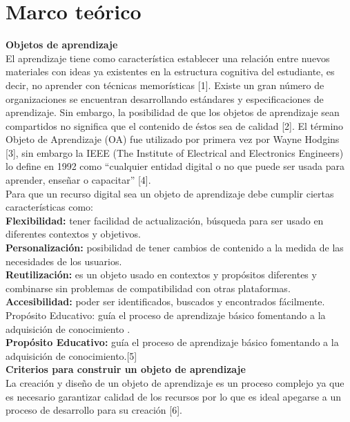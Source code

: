 \documentclass{llncs}
\begin{document}
\section{Marco teórico}
\textbf{Objetos de aprendizaje} \\
El aprendizaje tiene como característica establecer una relación entre nuevos materiales con ideas ya existentes en la estructura cognitiva del estudiante, es decir,  no aprender con técnicas memorísticas [1]. Existe un gran número de organizaciones se encuentran desarrollando estándares y especificaciones de aprendizaje. Sin embargo, la posibilidad de que los objetos de aprendizaje sean compartidos no significa que el contenido de éstos sea de calidad [2].
El término Objeto de Aprendizaje (OA) fue utilizado por primera vez por Wayne Hodgins [3], sin embargo la IEEE (The Institute of Electrical and Electronics Engineers) lo define en 1992 como “cualquier entidad digital o no que puede ser usada para aprender, enseñar o capacitar” [4].\\
Para que un recurso digital  sea un objeto de aprendizaje debe cumplir ciertas características como:\\
\textbf{Flexibilidad:} tener facilidad de actualización, búsqueda para ser usado en diferentes contextos y objetivos.\\
\textbf{Personalización:} posibilidad de tener cambios de contenido a la medida de las necesidades de los usuarios.\\
\textbf{Reutilización:} es un objeto usado en contextos y propósitos diferentes y combinarse sin problemas de compatibilidad con otras plataformas.\\
\textbf{Accesibilidad:} poder ser identificados, buscados y encontrados fácilmente.
Propósito Educativo: guía el proceso de aprendizaje básico fomentando a la adquisición de conocimiento .\\
\textbf{Propósito Educativo:} guía el proceso de aprendizaje básico fomentando a la adquisición de conocimiento.[5]\\
\textbf{Criterios para construir un objeto de aprendizaje} \\
La creación y diseño de un objeto de aprendizaje es un proceso complejo ya que es necesario garantizar calidad de los recursos por lo que es ideal apegarse a un proceso de desarrollo para su creación [6].
\end{document}

